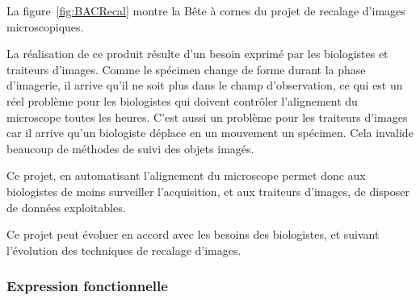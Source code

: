 La figure~\ref{fig:BACRecal} montre la Bête à cornes du projet de recalage d'images microscopiques.

La réalisation de ce produit résulte d'un besoin exprimé par les biologistes et traiteurs d'images.
Comme le spécimen change de forme durant la phase d'imagerie, il arrive qu'il ne soit plus dans le champ d'observation, ce qui est un réel problème pour les biologistes qui doivent contrôler l'alignement du microscope toutes les heures.
C'est aussi un problème pour les traiteurs d'images
car il arrive qu'un biologiste déplace en un mouvement un spécimen.
Cela invalide beaucoup de méthodes de suivi des objets imagés.

Ce projet, en automatisant l'alignement du microscope permet donc aux biologistes de moins surveiller l'acquisition,
et aux traiteurs d'images, de disposer de données exploitables.

Ce projet peut évoluer en accord avec les besoins des biologistes, et suivant l'évolution des techniques de recalage d'images.

\subsubsection{Expression fonctionnelle}

